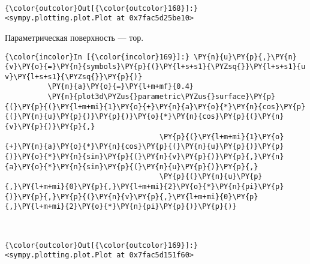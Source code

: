     \begin{center}
    \end{center}
    { \hspace*{\fill} \\}
    
            \begin{Verbatim}[commandchars=\\\{\}]
{\color{outcolor}Out[{\color{outcolor}168}]:} <sympy.plotting.plot.Plot at 0x7fac5d25be10>
\end{Verbatim}
        
    Параметрическая поверхность --- тор.

    \begin{Verbatim}[commandchars=\\\{\}]
{\color{incolor}In [{\color{incolor}169}]:} \PY{n}{u}\PY{p}{,}\PY{n}{v}\PY{o}{=}\PY{n}{symbols}\PY{p}{(}\PY{l+s+s1}{\PYZsq{}}\PY{l+s+s1}{u v}\PY{l+s+s1}{\PYZsq{}}\PY{p}{)}
          \PY{n}{a}\PY{o}{=}\PY{l+m+mf}{0.4}
          \PY{n}{plot3d\PYZus{}parametric\PYZus{}surface}\PY{p}{(}\PY{p}{(}\PY{l+m+mi}{1}\PY{o}{+}\PY{n}{a}\PY{o}{*}\PY{n}{cos}\PY{p}{(}\PY{n}{u}\PY{p}{)}\PY{p}{)}\PY{o}{*}\PY{n}{cos}\PY{p}{(}\PY{n}{v}\PY{p}{)}\PY{p}{,}
                                    \PY{p}{(}\PY{l+m+mi}{1}\PY{o}{+}\PY{n}{a}\PY{o}{*}\PY{n}{cos}\PY{p}{(}\PY{n}{u}\PY{p}{)}\PY{p}{)}\PY{o}{*}\PY{n}{sin}\PY{p}{(}\PY{n}{v}\PY{p}{)}\PY{p}{,}\PY{n}{a}\PY{o}{*}\PY{n}{sin}\PY{p}{(}\PY{n}{u}\PY{p}{)}\PY{p}{,}
                                    \PY{p}{(}\PY{n}{u}\PY{p}{,}\PY{l+m+mi}{0}\PY{p}{,}\PY{l+m+mi}{2}\PY{o}{*}\PY{n}{pi}\PY{p}{)}\PY{p}{,}\PY{p}{(}\PY{n}{v}\PY{p}{,}\PY{l+m+mi}{0}\PY{p}{,}\PY{l+m+mi}{2}\PY{o}{*}\PY{n}{pi}\PY{p}{)}\PY{p}{)}
\end{Verbatim}

    \begin{center}
    \end{center}
    { \hspace*{\fill} \\}
    
            \begin{Verbatim}[commandchars=\\\{\}]
{\color{outcolor}Out[{\color{outcolor}169}]:} <sympy.plotting.plot.Plot at 0x7fac5d151f60>
\end{Verbatim}
